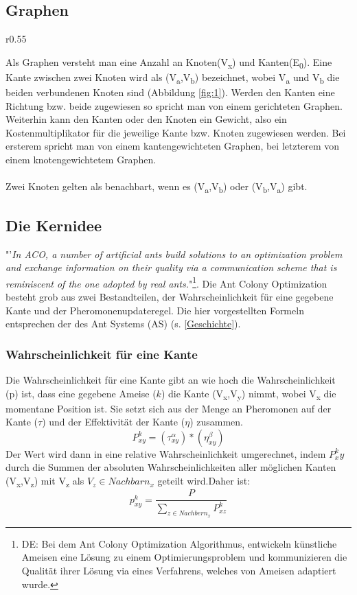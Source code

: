 \documentclass[12pt]{article}
\begin{document}
\subsection{Graphen}
\begin{wrapfigure}{r}{0.55\textwidth}
\centering
{}
\caption{Einfacher Graph}
\label{fig:1}
\end{wrapfigure}
Als Graphen versteht man eine Anzahl an Knoten(V\textsubscript{x}) und Kanten(E\textsubscript{0}). Eine Kante zwischen zwei Knoten wird als (V\textsubscript{a},V\textsubscript{b}) bezeichnet, wobei V\textsubscript{a} und V\textsubscript{b} die beiden verbundenen Knoten sind (Abbildung \ref{fig:1}). Werden den Kanten eine Richtung bzw. beide zugewiesen so spricht man von einem gerichteten Graphen. Weiterhin kann den Kanten oder den Knoten ein Gewicht, also ein Kostenmultiplikator für die jeweilige Kante bzw. Knoten zugewiesen werden. Bei ersterem spricht man von einem kantengewichteten Graphen, bei letzterem von einem knotengewichtetem Graphen.\\\\
Zwei Knoten gelten als benachbart, wenn es (V\textsubscript{a},V\textsubscript{b}) oder (V\textsubscript{b},V\textsubscript{a}) gibt.
\subsection{Die Kernidee}\label{Kernidee}
"'\textit{In ACO, a number of artificial ants build solutions to an optimization problem and exchange information on their quality via a communication scheme that is reminiscent of the one adopted by real ants.}"\cite{ dorigo2007ant}\footnote{DE: Bei dem Ant Colony Optimization Algorithmus, entwickeln künstliche Ameisen eine Lösung zu einem Optimierungsproblem und kommunizieren die Qualität ihrer Lösung via eines Verfahrens, welches von Ameisen adaptiert wurde.  }. 
Die Ant Colony Optimization besteht grob aus zwei Bestandteilen, der Wahrscheinlichkeit für eine gegebene Kante und der Pheromonenupdateregel. Die hier vorgestellten Formeln entsprechen der des Ant Systems (AS) (s. \ref{Geschichte}).
\subsubsection{Wahrscheinlichkeit für eine Kante}\label{P/p}
Die Wahrscheinlichkeit für eine Kante gibt an wie hoch die Wahrscheinlichkeit (p) ist, dass eine gegebene Ameise ($k$) die Kante (V\textsubscript{x},V\textsubscript{y}) nimmt, wobei V\textsubscript{x} die momentane Position ist. Sie setzt sich aus der Menge an Pheromonen auf der Kante ($\tau$) und der Effektivität der Kante ($\eta$) zusammen. \[ P ^{ k }_{ xy }=\left(  \tau ^{ \alpha }_{ xy } \right)*\left(  \eta ^{ \beta }_{ xy } \right)\]
Der Wert wird dann in eine relative Wahrscheinlichkeit umgerechnet, indem $P^k_xy$ durch die Summen der absoluten Wahrscheinlichkeiten aller möglichen Kanten (V\textsubscript{x},V\textsubscript{z}) mit V\textsubscript{z} als $V_z \in Nachbarn_{x}$ geteilt wird.Daher ist: \[p^{k}_{xy}=\frac{P}{\sum_{z\in Nachbern_x}{}P^{k }_{xz}} \]
\end{document}
